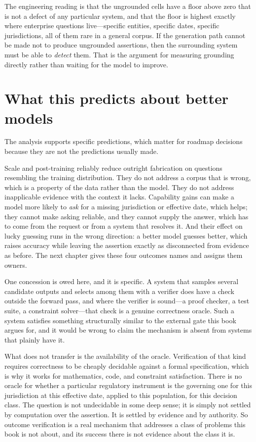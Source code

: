 The engineering reading is that the ungrounded cells have a floor above zero that
is not a defect of any particular system, and that the floor is highest exactly
where enterprise questions live---specific entities, specific dates, specific
jurisdictions, all of them rare in a general corpus. If the generation path cannot
be made not to produce ungrounded assertions, then the surrounding system must be
able to \emph{detect} them. That is the argument for measuring grounding directly
rather than waiting for the model to improve.

\section{What this predicts about better models}
\label{sec:better-models}

The analysis supports specific predictions, which matter for roadmap decisions
because they are not the predictions usually made.

Scale and post-training reliably reduce outright fabrication on questions
resembling the training distribution. They do not address a corpus that is wrong,
which is a property of the data rather than the model. They do not address
inapplicable evidence with the context it lacks. Capability gains can make a model
more likely to \emph{ask} for a missing jurisdiction or effective date, which helps;
they cannot make asking reliable, and they cannot supply the answer, which has to come
from the request or from a system that resolves it. And their effect on lucky
guessing runs in the wrong direction: a better model guesses better, which raises
accuracy while leaving the assertion exactly as disconnected from evidence as
before. The next chapter gives these four outcomes
names and assigns them owners.

One concession is owed here, and it is specific. A system that samples several
candidate outputs and selects among them with a verifier does have a check outside the
forward pass, and where the verifier is sound---a proof checker, a test suite, a
constraint solver---that check is a genuine correctness oracle. Such a system satisfies
something structurally similar to the external gate this book argues for, and it
would be wrong to claim the mechanism is
absent from systems that plainly have it.

What does not transfer is the availability of the oracle. Verification of that kind
requires correctness to be cheaply decidable against a formal specification, which is
why it works for mathematics, code, and constraint satisfaction. There is no oracle
for whether a particular regulatory instrument is the governing one for this
jurisdiction at this effective date, applied to this population, for this decision
class. The question is not undecidable in some deep sense; it is simply not settled by
computation over the assertion. It is settled by evidence and by
authority. So
outcome verification is a real mechanism that addresses a class of problems this book
is not about, and its success there is not evidence about the class it is.

